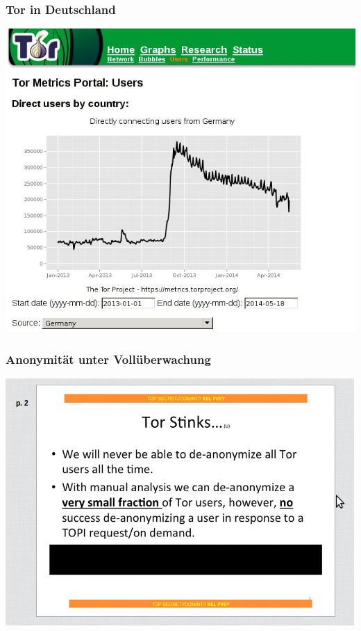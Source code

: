 \documentclass[12pt]{beamer}
\begin{document}
\begin{frame}
    \frametitle{Tor in Deutschland}
    \includegraphics[height=0.7\textheight]{img/torgermany.jpg}
\end{frame}

\begin{frame}
    \frametitle{Anonymität unter Vollüberwachung}
    \includegraphics[height=0.7\textheight]{img/torstinks.png}
\end{frame}

\end{document}
